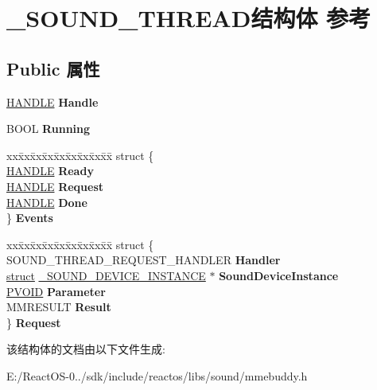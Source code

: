 \hypertarget{struct___s_o_u_n_d___t_h_r_e_a_d}{}\section{\+\_\+\+S\+O\+U\+N\+D\+\_\+\+T\+H\+R\+E\+A\+D结构体 参考}
\label{struct___s_o_u_n_d___t_h_r_e_a_d}
\subsection*{Public 属性}
\begin{DoxyCompactItemize}
\item 
\mbox{\label{struct___s_o_u_n_d___t_h_r_e_a_d_ab17b5b09d2dbd61620539fafc2840dd5}} 
\hyperlink{interfacevoid}{H\+A\+N\+D\+LE} {\bfseries Handle}
\item 
\mbox{\label{struct___s_o_u_n_d___t_h_r_e_a_d_a82b9bd4f06d7545fb1e848d30e45dd09}} 
B\+O\+OL {\bfseries Running}
\item 
\mbox{\label{struct___s_o_u_n_d___t_h_r_e_a_d_aaabff6d1dc293ebae68e2a6d7181017d}} 
\begin{tabbing}
xx\=xx\=xx\=xx\=xx\=xx\=xx\=xx\=xx\=\kill
struct \{\\
\>\hyperlink{interfacevoid}{HANDLE} {\bfseries Ready}\\
\>\hyperlink{interfacevoid}{HANDLE} {\bfseries Request}\\
\>\hyperlink{interfacevoid}{HANDLE} {\bfseries Done}\\
\} {\bfseries Events}\\

\end{tabbing}\item 
\mbox{\label{struct___s_o_u_n_d___t_h_r_e_a_d_afad7fd13dd5f2f978f56a6266a642953}} 
\begin{tabbing}
xx\=xx\=xx\=xx\=xx\=xx\=xx\=xx\=xx\=\kill
struct \{\\
\>SOUND\_THREAD\_REQUEST\_HANDLER {\bfseries Handler}\\
\>\hyperlink{interfacestruct}{struct} \hyperlink{struct___s_o_u_n_d___d_e_v_i_c_e___i_n_s_t_a_n_c_e}{\_SOUND\_DEVICE\_INSTANCE} $\ast$ {\bfseries SoundDeviceInstance}\\
\>\hyperlink{interfacevoid}{PVOID} {\bfseries Parameter}\\
\>MMRESULT {\bfseries Result}\\
\} {\bfseries Request}\\

\end{tabbing}\end{DoxyCompactItemize}


该结构体的文档由以下文件生成\+:\begin{DoxyCompactItemize}
\item 
E\+:/\+React\+O\+S-\/0../sdk/include/reactos/libs/sound/mmebuddy.\+h\end{DoxyCompactItemize}
